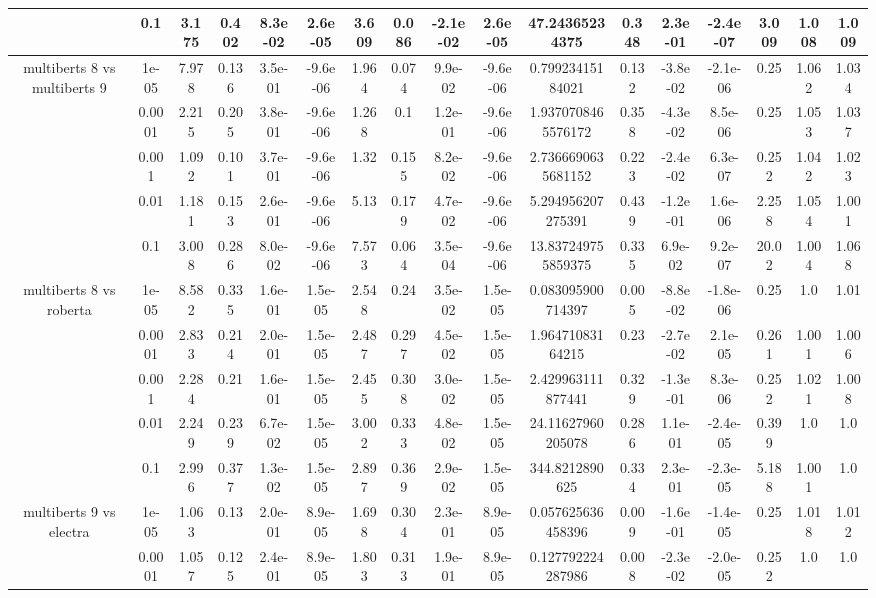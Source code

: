 \begin{tabular}{|c|c|c|c|c|c|c|c|c|c|c|c|c|c|c|c|c|}
 & 0.1 & 3.175 & 0.402 & 8.3e-02 & 2.6e-05 & 3.609 & 0.086 & -2.1e-02 & 2.6e-05 & 47.24365234375 & 0.348 & 2.3e-01 & -2.4e-07 & 3.009 & 1.008 & 1.009 \\
\hline
\multirow{5}{*}{multiberts 8 vs multiberts 9} & 1e-05 & 7.978 & 0.136 & 3.5e-01 & -9.6e-06 & 1.964 & 0.074 & 9.9e-02 & -9.6e-06 & 0.79923415184021 & 0.132 & -3.8e-02 & -2.1e-06 & 0.25 & 1.062 & 1.034 \\
 & 0.0001 & 2.215 & 0.205 & 3.8e-01 & -9.6e-06 & 1.268 & 0.1 & 1.2e-01 & -9.6e-06 & 1.9370708465576172 & 0.358 & -4.3e-02 & 8.5e-06 & 0.25 & 1.053 & 1.037 \\
 & 0.001 & 1.092 & 0.101 & 3.7e-01 & -9.6e-06 & 1.32 & 0.155 & 8.2e-02 & -9.6e-06 & 2.7366690635681152 & 0.223 & -2.4e-02 & 6.3e-07 & 0.252 & 1.042 & 1.023 \\
 & 0.01 & 1.181 & 0.153 & 2.6e-01 & -9.6e-06 & 5.13 & 0.179 & 4.7e-02 & -9.6e-06 & 5.294956207275391 & 0.439 & -1.2e-01 & 1.6e-06 & 2.258 & 1.054 & 1.001 \\
 & 0.1 & 3.008 & 0.286 & 8.0e-02 & -9.6e-06 & 7.573 & 0.064 & 3.5e-04 & -9.6e-06 & 13.837249755859375 & 0.335 & 6.9e-02 & 9.2e-07 & 20.02 & 1.004 & 1.068 \\
\hline
\multirow{5}{*}{multiberts 8 vs roberta } & 1e-05 & 8.582 & 0.335 & 1.6e-01 & 1.5e-05 & 2.548 & 0.24 & 3.5e-02 & 1.5e-05 & 0.083095900714397 & 0.005 & -8.8e-02 & -1.8e-06 & 0.25 & 1.0 & 1.01 \\
 & 0.0001 & 2.833 & 0.214 & 2.0e-01 & 1.5e-05 & 2.487 & 0.297 & 4.5e-02 & 1.5e-05 & 1.96471083164215 & 0.23 & -2.7e-02 & 2.1e-05 & 0.261 & 1.001 & 1.006 \\
 & 0.001 & 2.284 & 0.21 & 1.6e-01 & 1.5e-05 & 2.455 & 0.308 & 3.0e-02 & 1.5e-05 & 2.429963111877441 & 0.329 & -1.3e-01 & 8.3e-06 & 0.252 & 1.021 & 1.008 \\
 & 0.01 & 2.249 & 0.239 & 6.7e-02 & 1.5e-05 & 3.002 & 0.333 & 4.8e-02 & 1.5e-05 & 24.11627960205078 & 0.286 & 1.1e-01 & -2.4e-05 & 0.399 & 1.0 & 1.0 \\
 & 0.1 & 2.996 & 0.377 & 1.3e-02 & 1.5e-05 & 2.897 & 0.369 & 2.9e-02 & 1.5e-05 & 344.8212890625 & 0.334 & 2.3e-01 & -2.3e-05 & 5.188 & 1.001 & 1.0 \\
\hline
\multirow{5}{*}{multiberts 9 vs electra } & 1e-05 & 1.063 & 0.13 & 2.0e-01 & 8.9e-05 & 1.698 & 0.304 & 2.3e-01 & 8.9e-05 & 0.057625636458396 & 0.009 & -1.6e-01 & -1.4e-05 & 0.25 & 1.018 & 1.012 \\
 & 0.0001 & 1.057 & 0.125 & 2.4e-01 & 8.9e-05 & 1.803 & 0.313 & 1.9e-01 & 8.9e-05 & 0.127792224287986 & 0.008 & -2.3e-02 & -2.0e-05 & 0.252 & 1.0 & 1.0 \\

\end{tabular}
